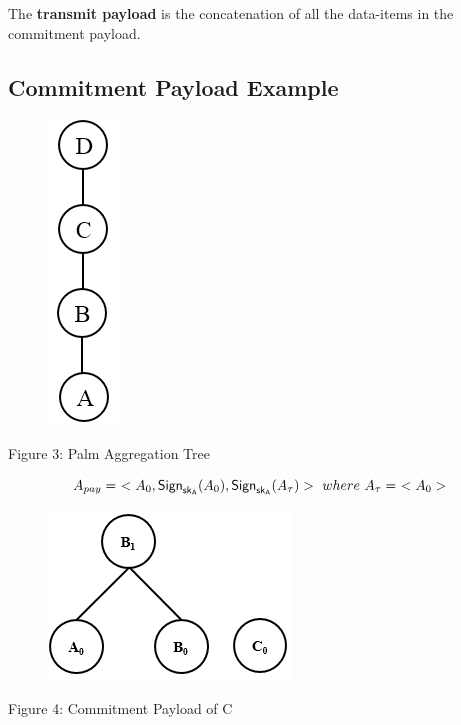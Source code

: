 \documentclass[%
  slidesonly,%
  semlayer%
  ]{seminar}                                  %
\newcommand{\sk}{\sf{sk}}
\begin{document}
\begin{slide}
      The \textbf{transmit payload} is the concatenation of all the data-items in the commitment payload.
      \vfill
      \clearpage

    \subsection*{Commitment Payload Example}
      \vfill
      \begin{figure}[h!]
        \centering
        \includegraphics[scale = 0.4]{images/palm-aggregation-tree.png}
      \end{figure}
      \begin{center}
        Figure 3: Palm Aggregation Tree
      \end{center}
      \begin{equation*}
        A_{pay} =\ <A_{0}, \textsf{Sign}_{\sk_{A}}(A_{0}), \textsf{Sign}_{\sk_{A}}(A_{\tau}) >\ where\ A_{\tau} =\ < A_{0} > 
      \end{equation*}
      \vfill
      \clearpage

      \vfill
      \begin{figure}
        \centering
        \includegraphics[scale = 0.5]{images/commitment-payload-of-C.png}
      \end{figure}
      \begin{center}
        Figure 4: Commitment Payload of C
      \end{center}


\end{slide}
\end{document}
